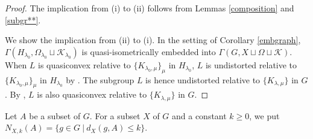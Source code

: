 \documentclass{amsart}
\theoremstyle{definition}
\begin{document}
\begin{proof}
The implication from (i) to (ii) follows from Lemmas \ref{composition} and \ref{subgr**}. 

We show the implication from (ii) to (i). 
In the setting of Corollary \ref{embgraph}, $\Gamma(H_{\lambda_0},\Omega_{\lambda_0}\sqcup{\mathcal K}_{\lambda_0})$ is quasi-isometrically embedded into $\Gamma(G,X\sqcup\Omega\sqcup{\mathcal K})$. 
When $L$ is quasiconvex relative to $\{K_{\lambda_0,\mu}\}_\mu$ in $H_{\lambda_0}$, $L$ is undistorted relative to $\{K_{\lambda_0,\mu}\}_\mu$ in $H_{\lambda_0}$ by \cite[Theorem 1.4 (i)]{M-O-Y1}. 
The subgroup $L$ is hence undistorted relative to $\{K_{\lambda,\mu}\}$ in $G$.
By \cite[Theorem 1.4 (i)]{M-O-Y1}, $L$ is also quasiconvex relative to $\{K_{\lambda,\mu}\}$ in $G$. 
\end{proof}

Let $A$ be a subset of $G$. 
For a subset $X$ of $G$ and a constant $k\geq 0$, we put $N_{X,k}(A)=\{g\in G \ | \ d_X(g,A)\leq k\}$. 
\end{document}
